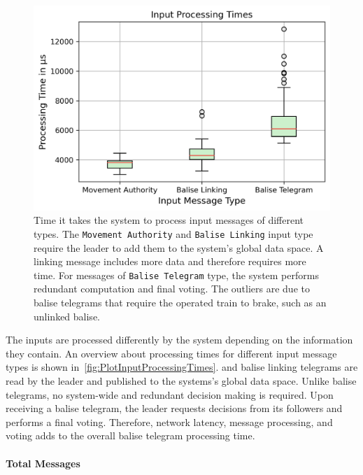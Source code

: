 \begin{figure}[!hb]
	\centering
	\includegraphics[width=0.8\linewidth]{images/plots/inputProcessingTimes}
	\caption{Time it takes the system to process input messages of different types. The \texttt{Movement Authority} and \texttt{Balise Linking} input type require the leader to add them to the system's global data space. A linking message includes more data and therefore requires more time. For messages of \texttt{Balise Telegram} type, the system performs redundant computation and final voting. The outliers are due to balise telegrams that require the operated train to brake, such as an unlinked balise.}
	\label{fig:PlotInputProcessingTimes}
\end{figure}

The inputs are processed differently by the system depending on the information they contain.
An overview about processing times for different input message types is shown in~\autoref{fig:PlotInputProcessingTimes}.
 and balise linking telegrams are read by the leader and published to the systems's global data space.
Unlike balise telegrams, no system-wide and redundant decision making is required.
Upon receiving a balise telegram, the leader requests decisions from its followers and performs a final voting.
Therefore, network latency, message processing, and voting adds to the overall balise telegram processing time.

\paragraph{Total Messages}


